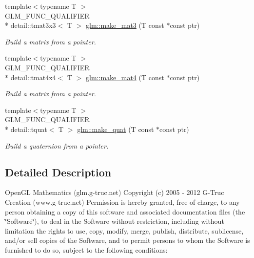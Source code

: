 \begin{DoxyCompactItemize}
{\footnotesize template$<$typename T $>$ }\\G\-L\-M\-\_\-\-F\-U\-N\-C\-\_\-\-Q\-U\-A\-L\-I\-F\-I\-E\-R \\*
detail\-::tmat3x3$<$ T $>$ \hyperlink{group__gtc__type__ptr_gacd8f067b4fb7bd3d48663102b5178ef2}{glm\-::make\-\_\-mat3} (T const $\ast$const ptr)
\begin{DoxyCompactList}\small\item\em Build a matrix from a pointer. \end{DoxyCompactList}\item 
{\footnotesize template$<$typename T $>$ }\\G\-L\-M\-\_\-\-F\-U\-N\-C\-\_\-\-Q\-U\-A\-L\-I\-F\-I\-E\-R \\*
detail\-::tmat4x4$<$ T $>$ \hyperlink{group__gtc__type__ptr_ga723dd6241d4edf2ad48b25e5007054a7}{glm\-::make\-\_\-mat4} (T const $\ast$const ptr)
\begin{DoxyCompactList}\small\item\em Build a matrix from a pointer. \end{DoxyCompactList}\item 
{\footnotesize template$<$typename T $>$ }\\G\-L\-M\-\_\-\-F\-U\-N\-C\-\_\-\-Q\-U\-A\-L\-I\-F\-I\-E\-R \\*
detail\-::tquat$<$ T $>$ \hyperlink{group__gtc__type__ptr_ga341b6592d08bc2e3871ceec05e0c060d}{glm\-::make\-\_\-quat} (T const $\ast$const ptr)
\begin{DoxyCompactList}\small\item\em Build a quaternion from a pointer. \end{DoxyCompactList}\end{DoxyCompactItemize}


\subsection{Detailed Description}
Open\-G\-L Mathematics (glm.\-g-\/truc.\-net) Copyright (c) 2005 -\/ 2012 G-\/\-Truc Creation (www.\-g-\/truc.\-net) Permission is hereby granted, free of charge, to any person obtaining a copy of this software and associated documentation files (the \char`\"{}\-Software\char`\"{}), to deal in the Software without restriction, including without limitation the rights to use, copy, modify, merge, publish, distribute, sublicense, and/or sell copies of the Software, and to permit persons to whom the Software is furnished to do so, subject to the following conditions\-:


